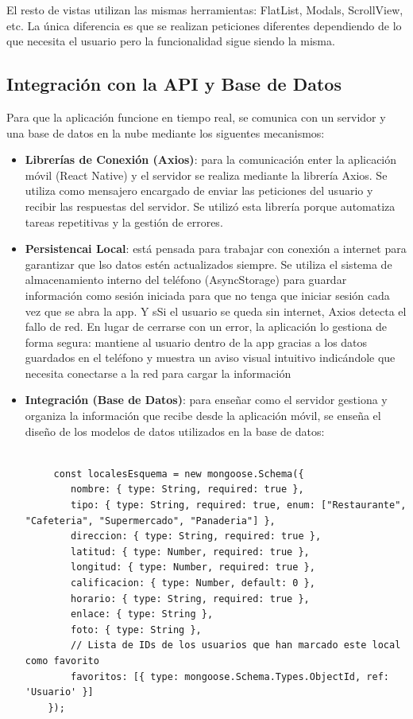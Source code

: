 \documentclass[a4paper,11pt]{article}
\begin{document}
El resto de vistas utilizan las mismas herramientas: FlatList, Modals, ScrollView, etc. La única diferencia es que se realizan peticiones diferentes dependiendo de lo que necesita el usuario pero la funcionalidad sigue siendo la misma.

\vspace{1cm}

\subsection{Integración con la API y Base de Datos}
Para que la aplicación funcione en tiempo real, se comunica con un servidor y una base de datos en la nube mediante los siguentes mecanismos:

\begin{itemize}
    \item \textbf{Librerías de Conexión (Axios)}: para la comunicación enter la aplicación móvil (React Native) y el servidor se realiza mediante la librería Axios. Se utiliza como mensajero encargado de enviar las peticiones del usuario y recibir las respuestas del servidor. Se utilizó esta librería porque automatiza tareas repetitivas y la gestión de errores.
    \item \textbf{Persistencai Local}: está pensada para trabajar con conexión a internet para garantizar que lso datos estén actualizados siempre. Se utiliza el sistema de almacenamiento interno del teléfono (AsyncStorage) para guardar información como sesión iniciada para que no tenga que iniciar sesión cada vez que se abra la app. Y sSi el usuario se queda sin internet, Axios detecta el fallo de red. En lugar de cerrarse con un error, la aplicación lo gestiona de forma segura: mantiene al usuario dentro de la app gracias a los datos guardados en el teléfono y muestra un aviso visual intuitivo indicándole que necesita conectarse a la red para cargar la información
    \item \textbf{Integración (Base de Datos)}: para enseñar como el servidor gestiona y organiza la información que recibe desde la aplicación móvil, se enseña el diseño de los modelos de datos utilizados en la base de datos:
    \vspace{0.2cm}
    \begin{lstlisting}[style=javascript, caption={Estructura para almacenar los locales en la Base de Datos.}]

     const localesEsquema = new mongoose.Schema({
        nombre: { type: String, required: true },
        tipo: { type: String, required: true, enum: ["Restaurante", "Cafeteria", "Supermercado", "Panaderia"] },
        direccion: { type: String, required: true },
        latitud: { type: Number, required: true },
        longitud: { type: Number, required: true },
        calificacion: { type: Number, default: 0 },
        horario: { type: String, required: true },
        enlace: { type: String },
        foto: { type: String },
        // Lista de IDs de los usuarios que han marcado este local como favorito
        favoritos: [{ type: mongoose.Schema.Types.ObjectId, ref: 'Usuario' }]
    });


\end{lstlisting}
\end{itemize}
\end{document}
